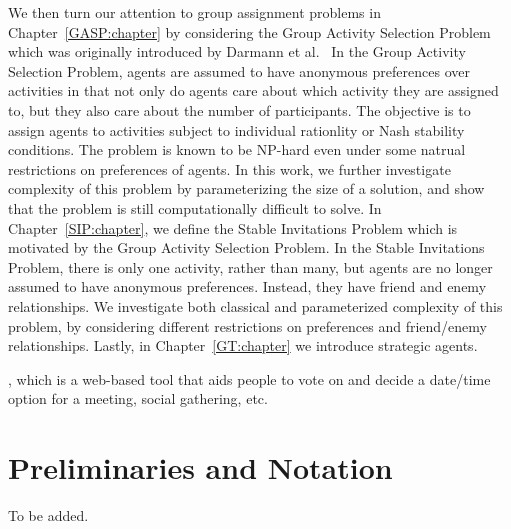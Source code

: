 We then turn our attention to group assignment problems in Chapter~\ref{GASP:chapter} by considering the Group Activity Selection Problem which was originally introduced by Darmann et al.~\cite{GASP12WINE} In the Group Activity Selection Problem, agents are assumed to have anonymous preferences over activities in that not only do agents care about which activity they are assigned to, but they also care about the number of participants. The objective is to assign agents to activities subject to individual rationlity or Nash stability conditions. The problem is known to be NP-hard even under some natrual restrictions on preferences of agents. In this work, we further investigate complexity of this problem by parameterizing the size of a solution, and show that the problem is still computationally difficult to solve. In Chapter~\ref{SIP:chapter}, we define the Stable Invitations Problem which is motivated by the Group Activity Selection Problem. In the Stable Invitations Problem, there is only one activity, rather than many, but agents are no longer assumed to have anonymous preferences. Instead, they have friend and enemy relationships. We investigate both classical and parameterized complexity of this problem, by considering different restrictions on preferences and friend/enemy relationships. Lastly, in Chapter~\ref{GT:chapter} we introduce strategic agents. 


, which is a web-based tool that aids people to vote on and decide a date/time option for a meeting, social gathering, etc. 

\section{Preliminaries and Notation}

To be added.

